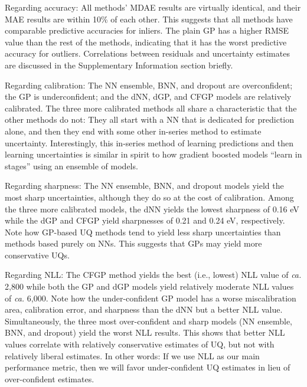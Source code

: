 \documentclass[]{achemso}
\begin{document}
Regarding accuracy:  All methods' \gls{MDAE} results are virtually identical, and their \gls{MAE} results are within 10\% of each other.
This suggests that all methods have comparable predictive accuracies for inliers.
The plain \gls{GP} has a higher \gls{RMSE} value than the rest of the methods, indicating that it has the worst predictive accuracy for outliers.
Correlations between residuals and uncertainty estimates are discussed in the Supplementary Information section briefly.

Regarding calibration:  The \gls{NN} ensemble, \gls{BNN}, and \gls{dropout} are overconfident; the \gls{GP} is underconfident; and the \gls{dNN}, \gls{dGP}, and \gls{CFGP} models are relatively calibrated.
The three more calibrated methods all share a characteristic that the other methods do not:  They all start with a \gls{NN} that is dedicated for prediction alone, and then they end with some other in-series method to estimate uncertainty.
Interestingly, this in-series method of learning predictions and then learning uncertainties is similar in spirit to how gradient boosted models ``learn in stages'' using an ensemble of models.

Regarding sharpness:  The \gls{NN} ensemble, \gls{BNN}, and \gls{dropout} models yield the most sharp uncertainties, although they do so at the cost of calibration.
Among the three more calibrated models, the \gls{dNN} yields the lowest sharpness of 0.16 eV while the \gls{dGP} and \gls{CFGP} yield sharpnesses of 0.21 and 0.24 eV, respectively.
Note how \gls{GP}-based \gls{UQ} methods tend to yield less sharp uncertainties than methods based purely on \gls{NN}s.
This suggests that \gls{GP}s may yield more conservative \gls{UQ}s.

Regarding \gls{NLL}:  The \gls{CFGP} method yields the best (i.e., lowest) \gls{NLL} value of \textit{ca.} 2,800 while both the \gls{GP} and \gls{dGP} models yield relatively moderate \gls{NLL} values of \textit{ca.} 6,000.
Note how the under-confident \gls{GP} model has a worse miscalibration area, calibration error, and sharpness than the \gls{dNN} but a better \gls{NLL} value.
Simultaneously, the three most over-confident and sharp models (\gls{NN} ensemble, \gls{BNN}, and \gls{dropout}) yield the worst \gls{NLL} results.
This shows that better \gls{NLL} values correlate with relatively conservative estimates of \gls{UQ}, but not with relatively liberal estimates.
In other words:  If we use \gls{NLL} as our main performance metric, then we will favor under-confident \gls{UQ} estimates in lieu of over-confident estimates.
\end{document}
